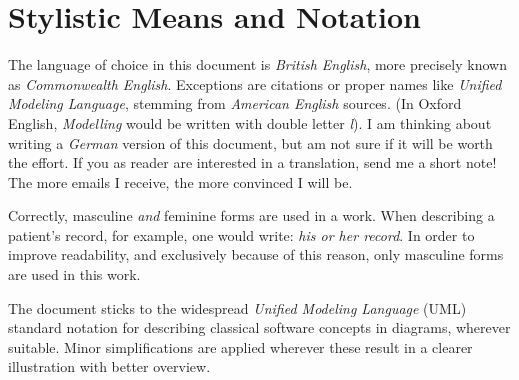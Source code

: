 %
%
%
%
%
%
%

\section*{Stylistic Means and Notation}
\label{stylistic_means_heading}

The language of choice in this document is \emph{British English}, more
precisely known as \emph{Commonwealth English}. Exceptions are citations or
proper names like \emph{Unified Modeling Language}, stemming from
\emph{American English} sources. (In Oxford English, \emph{Modelling} would be
written with double letter \emph{l}). I am thinking about writing a
\emph{German} version of this document, but am not sure if it will be worth the
effort. If you as reader are interested in a translation, send me a short note!
The more emails I receive, the more convinced I will be.


Correctly, masculine \emph{and} feminine forms are used in a work. When
describing a patient's record, for example, one would write: \textit{his or her
record}. In order to improve readability, and exclusively because of this
reason, only masculine forms are used in this work.

The document sticks to the widespread \emph{Unified Modeling Language} (UML)
\cite{uml} standard notation for describing classical software concepts in
diagrams, wherever suitable. Minor simplifications are applied wherever these
result in a clearer illustration with better overview.

